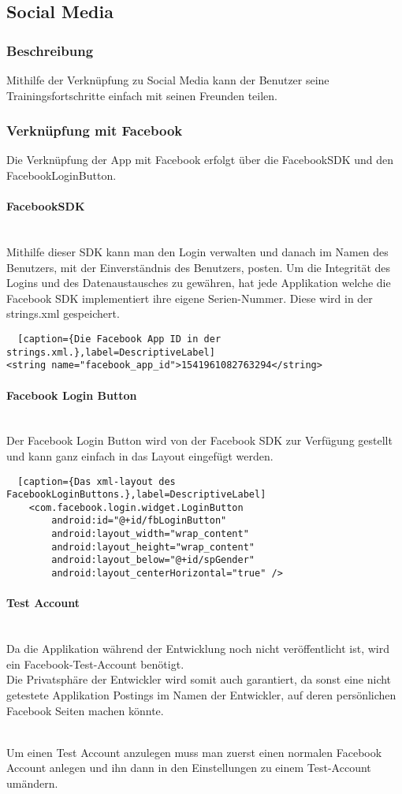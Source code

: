 \documentclass[FIPLY_base.tex]{subfiles}
\begin{document}
\subsection{ Social Media}
\subsubsection{Beschreibung}
Mithilfe der Verknüpfung zu Social Media kann der Benutzer seine Trainingsfortschritte einfach mit seinen Freunden teilen. 
\subsubsection{Verknüpfung mit Facebook}
Die Verknüpfung der App mit Facebook erfolgt über die FacebookSDK und den FacebookLoginButton.
\paragraph{FacebookSDK}\ \\
Mithilfe dieser SDK kann man den Login verwalten und danach im Namen des Benutzers, mit der Einverständnis des Benutzers, posten.
Um die Integrität des Logins und des Datenaustausches zu gewähren, hat jede Applikation welche die Facebook SDK implementiert ihre eigene Serien-Nummer.
Diese wird in der strings.xml gespeichert.
\begin{lstlisting}  [caption={Die Facebook App ID in der strings.xml.},label=DescriptiveLabel]
<string name="facebook_app_id">1541961082763294</string>
\end{lstlisting}
\paragraph{Facebook Login Button}\ \\
Der Facebook Login Button wird von der Facebook SDK zur Verfügung gestellt und kann ganz einfach in das Layout eingefügt werden.
\begin{lstlisting}  [caption={Das xml-layout des FacebookLoginButtons.},label=DescriptiveLabel]
    <com.facebook.login.widget.LoginButton
        android:id="@+id/fbLoginButton"
        android:layout_width="wrap_content"
        android:layout_height="wrap_content"
        android:layout_below="@+id/spGender"
        android:layout_centerHorizontal="true" />
\end{lstlisting}

\newpage
\paragraph{Test Account}\ \\
Da die Applikation während der Entwicklung noch nicht veröffentlicht ist, wird ein Facebook-Test-Account benötigt. \ \\
Die Privatsphäre der Entwickler wird somit auch garantiert, da sonst eine nicht getestete Applikation Postings im Namen der Entwickler, auf deren persönlichen Facebook Seiten machen könnte.

\ \\
Um einen Test Account anzulegen muss man zuerst einen normalen Facebook Account anlegen und ihn dann in den Einstellungen zu einem Test-Account umändern.
\end{document}
